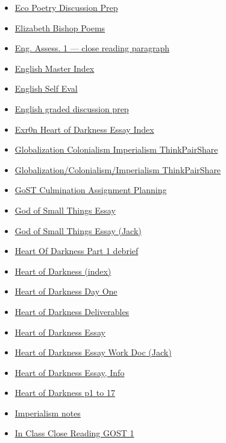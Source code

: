 \documentclass[11pt]{article}
\begin{document}
\begin{itemize}
\begin{itemize}
\item \href{eng201/KBxEcoPoetryDiscussionPrep.org}{Eco Poetry Discussion Prep}
\item \href{eng201/KBElizabethBishop.org}{Elizabeth Bishop Poems}
\item \href{eng201/KBhENG201CloseReadingParagraph.org}{Eng. Assess. 1 --- close reading paragraph}
\item \href{eng201/KBEnglishMasterIndex.org}{English Master Index}
\item \href{eng201/KBxEngSelfEval.org}{English Self Eval}
\item \href{eng201/KBENG201GradedDiscussionPrep.org}{English graded discussion prep}
\item \href{eng201/KBe20eng201retHeartOfDarknessEssay.org}{Exr0n Heart of Darkness Essay Index}
\item \href{eng201/KB20200824144641.org}{Globalization Colonialism Imperialism ThinkPairShare}
\item \href{eng201/KBe-2020eng201floD1Breakout.org}{Globalization/Colonialism/Imperialism ThinkPairShare}
\item \href{eng201/KBxGoSTCulminationPlanning.org}{GoST Culmination Assignment Planning}
\item \href{eng201/KBe21eng201retGoSTEssay.org}{God of Small Things Essay}
\item \href{eng201/KBhENG201GoSTEssayPlanningJack.org}{God of Small Things Essay (Jack)}
\item \href{eng201/KBe20eng201part1.org}{Heart Of Darkness Part 1 debrief}
\item \href{eng201/KBhENG201HeartOfHardness.org}{Heart of Darkness (index)}
\item \href{eng201/KBheartday1.org}{Heart of Darkness Day One}
\item \href{eng201/KBe20eng201retHeartOfDarknessDump.org}{Heart of Darkness Deliverables}
\item \href{eng201/KBxHoDEssay.org}{Heart of Darkness Essay}
\item \href{eng201/KBhENG201HODEssayPlanning.org}{Heart of Darkness Essay Work Doc (Jack)}
\item \href{eng201/KBENG201HoDLitAnalysisEssay.org}{Heart of Darkness Essay, Info}
\item \href{eng201/KBhENG201Page0t17.org}{Heart of Darkness p1 to 17}
\item \href{eng201/KBe2020eng201floImperalismNotes.org}{Imperialism notes}
\item \href{eng201/KBxInClassCloseReadingGOST1.org}{In Class Close Reading GOST 1}

\end{itemize}
\end{itemize}
\end{document}
